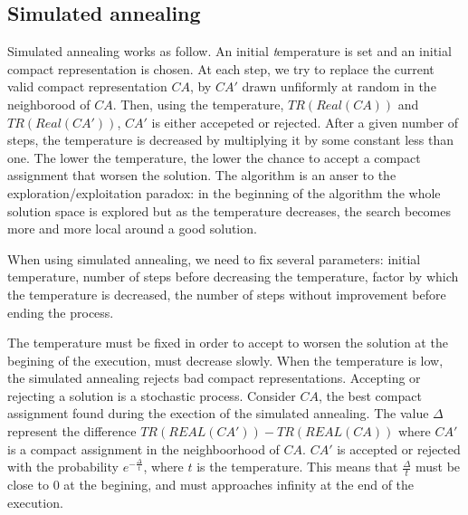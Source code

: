 \subsection{Simulated annealing}

Simulated annealing works as follow. An initial {\emph temperature} is set and an initial compact representation is chosen. At each step, we try to replace the current valid compact representation $CA$, by $CA'$ drawn unfiformly at random in the neighborood of $CA$. Then, using the temperature, $TR(Real(CA))$ and $TR(Real(CA'))$, $CA'$ is either accepeted or rejected. After a given number of steps, the temperature is decreased by multiplying it by some constant less than one. The lower the temperature, the lower the chance to accept a compact assignment that worsen the solution. The algorithm is an anser to the exploration/exploitation paradox: in the beginning of the algorithm the whole solution space is explored but as the temperature decreases, the search becomes more and more local around a good solution.

 When using simulated annealing, we need to fix several parameters: initial temperature, number of steps before decreasing the temperature, factor by which the temperature is decreased, the number of steps without improvement before ending the process.


 The temperature must be fixed in order to accept to worsen the solution at the begining of the execution, must decrease slowly. When the temperature is low, the simulated annealing rejects bad compact representations.
 Accepting or rejecting a solution is a stochastic process. Consider $CA$, the best compact assignment found during the exection of the simulated annealing. The value $\Delta$ represent the difference $TR(REAL(CA'))-TR(REAL(CA))$ where $CA'$ is a compact assignment in the neighboorhood of $CA$. $CA'$ is accepted or rejected with the probability $e^{-\frac{\Delta}{t}} $, where $t$ is the temperature.
 This means that $\frac{\Delta}{t}$ must be close to $0$ at the begining, and must approaches infinity at the end of the execution. 
 
